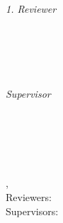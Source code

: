 \begin{titlepage}
    \vfill
    \begin{minipage}[t]{.27\textwidth}
        \raggedleft
        \textit{1. Reviewer}
    \end{minipage}
    \hspace*{15pt}
    \begin{minipage}[t]{.65\textwidth}
        {\Large \thesisFirstReviewer} \\
        {\small \thesisFirstReviewerDepartment} \\[-1mm]
        {\small \thesisFirstReviewerUniversity}
    \end{minipage} \\[5mm]
    \begin{minipage}[t]{.27\textwidth}
        \raggedleft
        \textit{Supervisor}
    \end{minipage}
    \hspace*{15pt}
    \begin{minipage}[t]{.65\textwidth}
        \thesisFirstSupervisor%
    \end{minipage} \\[10mm]

    \thesisDate \\

\end{titlepage}


\hfill
\vfill

{
    \small
    \textbf{\thesisName} \\
    \textit{\thesisTitle} \\
    \thesisSubject, \thesisDate \\
    Reviewers: \thesisFirstReviewer \\
    Supervisors: \thesisFirstSupervisor \\[1.5em]%
    \textbf{\thesisUniversity} \\
    \thesisUniversityInstitute \\
    \thesisUniversityStreetAddress \\
    \thesisUniversityPostalCode\ \thesisUniversityCity
}
